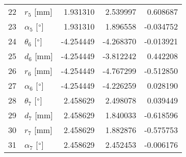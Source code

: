 \documentclass{standalone}%
\begin{document}
\begin{tabular}{llrrr}
22 &              $r_{5}$ [mm] &  1.931310 &   2.539997 &   0.608687 \\
23 &  $\alpha_{5}$ [$\degree$] &  1.931310 &   1.896558 &  -0.034752 \\
24 &  $\theta_{6}$ [$\degree$] & -4.254449 &  -4.268370 &  -0.013921 \\
25 &              $d_{6}$ [mm] & -4.254449 &  -3.812242 &   0.442208 \\
26 &              $r_{6}$ [mm] & -4.254449 &  -4.767299 &  -0.512850 \\
27 &  $\alpha_{6}$ [$\degree$] & -4.254449 &  -4.226259 &   0.028190 \\
28 &  $\theta_{7}$ [$\degree$] &  2.458629 &   2.498078 &   0.039449 \\
29 &              $d_{7}$ [mm] &  2.458629 &   1.840033 &  -0.618596 \\
30 &              $r_{7}$ [mm] &  2.458629 &   1.882876 &  -0.575753 \\
31 &  $\alpha_{7}$ [$\degree$] &  2.458629 &   2.452453 &  -0.006176 \\
\bottomrule
\end{tabular}
%
\end{document}
